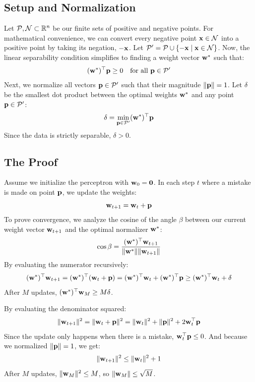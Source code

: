 \subsection{Setup and Normalization}

Let $\mathcal{P}, \mathcal{N} \subset \mathbb{R}^n$ be our finite sets of positive and negative points. For mathematical convenience, we can convert every negative point $\mathbf{x} \in \mathcal{N}$ into a positive point by taking its negation, $-\mathbf{x}$. Let $\mathcal{P}' = \mathcal{P} \cup \{-\mathbf{x} \mid \mathbf{x} \in \mathcal{N}\}$. 
Now, the linear separability condition simplifies to finding a weight vector $\mathbf{w}^*$ such that:
\[
(\mathbf{w}^*)^\top \mathbf{p} \geq 0 \quad \text{for all } \mathbf{p} \in \mathcal{P}'
\]
Next, we normalize all vectors $\mathbf{p} \in \mathcal{P}'$ such that their magnitude $\|\mathbf{p}\| = 1$. Let $\delta$ be the smallest dot product between the optimal weights $\mathbf{w}^*$ and any point $\mathbf{p} \in \mathcal{P}'$:
\[
\delta = \min_{\mathbf{p} \in \mathcal{P}'} (\mathbf{w}^*)^\top \mathbf{p}
\]
Since the data is strictly separable, $\delta > 0$.

\subsection{The Proof}

Assume we initialize the perceptron with $\mathbf{w}_0 = \mathbf{0}$. 
In each step $t$ where a mistake is made on point $\mathbf{p}$, we update the weights:
\[
\mathbf{w}_{t+1} = \mathbf{w}_t + \mathbf{p}
\]
To prove convergence, we analyze the cosine of the angle $\beta$ between our current weight vector $\mathbf{w}_{t+1}$ and the optimal normalizer $\mathbf{w}^*$:
\[
\cos \beta = \frac{(\mathbf{w}^*)^\top \mathbf{w}_{t+1}}{\|\mathbf{w}^*\| \|\mathbf{w}_{t+1}\|}
\]
By evaluating the numerator recursively:
\[
(\mathbf{w}^*)^\top \mathbf{w}_{t+1} = (\mathbf{w}^*)^\top (\mathbf{w}_t + \mathbf{p}) = (\mathbf{w}^*)^\top \mathbf{w}_t + (\mathbf{w}^*)^\top \mathbf{p} \geq (\mathbf{w}^*)^\top \mathbf{w}_t + \delta
\]
After $M$ updates, $(\mathbf{w}^*)^\top \mathbf{w}_M \geq M \delta$.

By evaluating the denominator squared:
\[
\|\mathbf{w}_{t+1}\|^2 = \|\mathbf{w}_t + \mathbf{p}\|^2 = \|\mathbf{w}_t\|^2 + \|\mathbf{p}\|^2 + 2\mathbf{w}_t^\top \mathbf{p}
\]
Since the update only happens when there is a mistake, $\mathbf{w}_t^\top \mathbf{p} \leq 0$. And because we normalized $\|\mathbf{p}\| = 1$, we get:
\[
\|\mathbf{w}_{t+1}\|^2 \leq \|\mathbf{w}_t\|^2 + 1
\]
After $M$ updates, $\|\mathbf{w}_M\|^2 \leq M$, so $\|\mathbf{w}_M\| \leq \sqrt{M}$.

